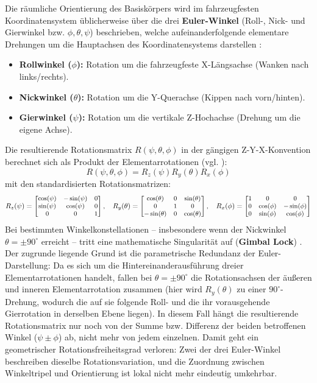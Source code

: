 Die räumliche Orientierung des Basiskörpers wird im fahrzeugfesten Koordinatensystem üblicherweise über die drei \textbf{Euler-Winkel} (Roll-, Nick- und Gierwinkel bzw. $\phi, \theta, \psi$) beschrieben, welche aufeinanderfolgende elementare Drehungen um die Hauptachsen des Koordinatensystems darstellen \cite{Siciliano2016Handbook}:
\begin{itemize}
	\item \textbf{Rollwinkel ($\phi$):} Rotation um die fahrzeugfeste X-Längsachse (Wanken nach links/rechts).
	\item \textbf{Nickwinkel ($\theta$):} Rotation um die Y-Querachse (Kippen nach vorn/hinten).
	\item \textbf{Gierwinkel ($\psi$):} Rotation um die vertikale Z-Hochachse (Drehung um die eigene Achse).
\end{itemize}
Die resultierende Rotationsmatrix $R(\psi, \theta, \phi)$ in der gängigen Z-Y-X-Konvention berechnet sich als Produkt der Elementarrotationen (vgl. \cite{Siciliano2016Handbook}):
\begin{equation}
	R(\psi, \theta, \phi) = R_z(\psi) R_y(\theta) R_x(\phi)
\end{equation} 
mit den standardisierten Rotationsmatrizen:
\begin{equation}
\small
	R_z(\psi) = 
	\begin{bmatrix}
		\cos(\psi) & -\sin(\psi) & 0 \\
		\sin(\psi) & \cos(\psi) & 0 \\
		0 & 0 & 1
	\end{bmatrix}, \quad
	R_y(\theta) = 
	\begin{bmatrix}
		\cos(\theta) & 0 & \sin(\theta) \\
		0 & 1 & 0 \\
		-\sin(\theta) & 0 & \cos(\theta)
	\end{bmatrix}, \quad
	R_x(\phi) = 
	\begin{bmatrix}
		1 & 0 & 0 \\
		0 & \cos(\phi) & -\sin(\phi) \\
		0 & \sin(\phi) & \cos(\phi)
	\end{bmatrix}
\normalsize
\end{equation}
Bei bestimmten Winkelkonstellationen – insbesondere wenn der Nickwinkel $\theta = \pm 90^\circ$ erreicht – tritt eine mathematische Singularität auf (\textbf{Gimbal Lock}) \cite{Siciliano2016Handbook}. Der zugrunde liegende Grund ist die parametrische Redundanz der Euler-Darstellung: Da es sich um die Hintereinanderausführung dreier Elementarrotationen handelt, fallen bei $\theta = \pm 90^\circ$ die Rotationsachsen der äußeren und inneren Elementarrotation zusammen (hier wird $R_y(\theta)$ zu einer $90^\circ$-Drehung, wodurch die auf sie folgende Roll- und die ihr vorausgehende Gierrotation in derselben Ebene liegen). In diesem Fall hängt die resultierende Rotationsmatrix nur noch von der Summe bzw. Differenz der beiden betroffenen Winkel ($\psi \pm \phi$) ab, nicht mehr von jedem einzelnen. Damit geht ein geometrischer Rotationsfreiheitsgrad verloren: Zwei der drei Euler-Winkel beschreiben dieselbe Rotationsvariation, und die Zuordnung zwischen Winkeltripel und Orientierung ist lokal nicht mehr eindeutig umkehrbar.

